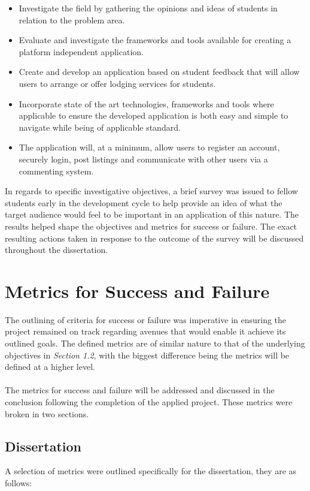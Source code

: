 \begin{itemize}
    \item Investigate the field by gathering the opinions and ideas of students in relation to the problem area.
    \item Evaluate and investigate the frameworks and tools available for creating a platform independent application.
    \item Create and develop an application based on student feedback that will allow users to arrange or offer lodging services for students.
    \item Incorporate state of the art technologies, frameworks and tools where applicable to ensure the developed application is both easy and simple to navigate while being of applicable standard.
    \item The application will, at a minimum, allow users to register an account, securely login, post listings and communicate with other users via a commenting system.
\end{itemize}

In regards to specific investigative objectives, a brief survey \cite{SURVEY} was issued to fellow students early in the development cycle to help provide an idea of what the target audience would feel to be important in an application of this nature. The results helped shape the objectives and metrics for success or failure. The exact resulting actions taken in response to the outcome of the survey will be discussed throughout the dissertation.

\section{Metrics for Success and Failure}
The outlining of criteria for success or failure was imperative in ensuring the project remained on track regarding avenues that would enable it achieve its outlined goals. The defined metrics are of similar nature to that of the underlying objectives in \textit{Section 1.2}, with the biggest difference being the metrics will be defined at a higher level. 

\paragraph{}
The metrics for success and failure will be addressed and discussed in the conclusion following the completion of the applied project. These metrics were broken in two sections.

\subsection{Dissertation}
A selection of metrics were outlined specifically for the dissertation, they are as follows: 

